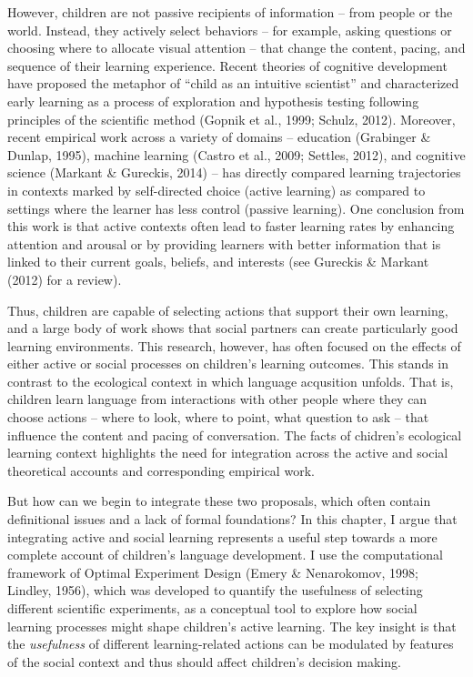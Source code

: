 \documentclass[oneside]{report}
\begin{document}
However, children are not passive recipients of information -- from
people or the world. Instead, they actively select behaviors -- for
example, asking questions or choosing where to allocate visual attention
-- that change the content, pacing, and sequence of their learning
experience. Recent theories of cognitive development have proposed the
metaphor of ``child as an intuitive scientist'' and characterized early
learning as a process of exploration and hypothesis testing following
principles of the scientific method (Gopnik et al., 1999; Schulz, 2012).
Moreover, recent empirical work across a variety of domains -- education
(Grabinger \& Dunlap, 1995), machine learning (Castro et al., 2009;
Settles, 2012), and cognitive science (Markant \& Gureckis, 2014) -- has
directly compared learning trajectories in contexts marked by
self-directed choice (active learning) as compared to settings where the
learner has less control (passive learning). One conclusion from this
work is that active contexts often lead to faster learning rates by
enhancing attention and arousal or by providing learners with better
information that is linked to their current goals, beliefs, and
interests (see Gureckis \& Markant (2012) for a review).

Thus, children are capable of selecting actions that support their own
learning, and a large body of work shows that social partners can create
particularly good learning environments. This research, however, has
often focused on the effects of either active or social processes on
children's learning outcomes. This stands in contrast to the ecological
context in which language acqusition unfolds. That is, children learn
language from interactions with other people where they can choose
actions -- where to look, where to point, what question to ask -- that
influence the content and pacing of conversation. The facts of chidren's
ecological learning context highlights the need for integration across
the active and social theoretical accounts and corresponding empirical
work.

But how can we begin to integrate these two proposals, which often
contain definitional issues and a lack of formal foundations? In this
chapter, I argue that integrating active and social learning represents
a useful step towards a more complete account of children's language
development. I use the computational framework of Optimal Experiment
Design (Emery \& Nenarokomov, 1998; Lindley, 1956), which was developed
to quantify the usefulness of selecting different scientific
experiments, as a conceptual tool to explore how social learning
processes might shape children's active learning. The key insight is
that the \emph{usefulness} of different learning-related actions can be
modulated by features of the social context and thus should affect
children's decision making.
\end{document}
